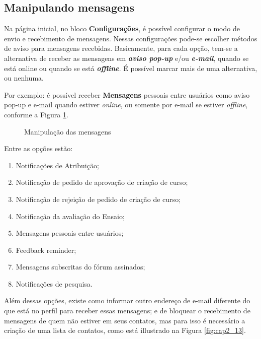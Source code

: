\subsection{Manipulando mensagens}
Na página inicial, no bloco \textbf{Configurações}, é possível configurar o modo de envio e recebimento de mensagens. Nessas configurações pode-se escolher métodos de aviso para mensagens recebidas. Basicamente, para cada opção, tem-se a alternativa de receber as mensagens em \textit{\textbf{aviso pop-up}} e/ou \textit{\textbf{e-mail}}, quando se está online ou quando se está \textit{\textbf{offline}}. É possível marcar mais de uma alternativa, ou nenhuma.

Por exemplo: é possível receber \textbf{Mensagens} pessoais entre usuários como aviso pop-up e e-mail quando estiver \textit{online}, ou somente por e-mail se estiver \textit{offline}, conforme a Figura \ref{fig:cap2_12}.

\begin{figure}[htbp]
 \begin{center}
  \caption{Manipulação das mensagens}
  \label{fig:cap2_12}
 \end{center}
\end{figure}

Entre as opções estão:
\begin{enumerate}
\item Notificações de Atribuição;
\item Notificação de pedido de aprovação de criação de curso;
\item Notificação de rejeição de pedido de criação de curso;
\item Notificação da avaliação do Ensaio;
\item Mensagens pessoais entre usuários;
\item Feedback reminder;
\item Mensagens subscritas do fórum assinados;
\item Notificações de pesquisa.
\end{enumerate}

Além dessas opções, existe como informar outro endereço de e-mail diferente do que está no perfil para receber essas mensagens; e de bloquear o recebimento de mensagens de quem não estiver em seus contatos, mas para isso é necessário a criação de uma lista de contatos, como está illustrado na Figura \ref{fig:cap2_13}.

